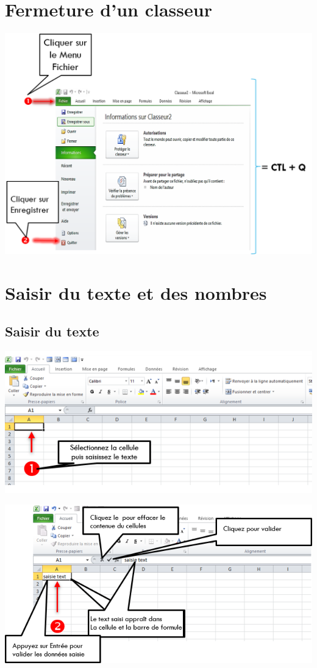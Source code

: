 \section{Fermeture d'un classeur}
\begin{center} 
	\includegraphics[scale=0.2,width=0.8\linewidth]{img/close_classeur} 
\end{center}

\section{ Saisir du texte et des nombres }
\subsection{ Saisir du texte}
\begin{center} 
	\includegraphics[scale=0.2,width=0.6\linewidth]{img/selecte_cellule} 
 
\end{center}
\begin{center} 
	\includegraphics[scale=0.2,width=0.7\linewidth]{img/saisie_text} 
\end{center}
